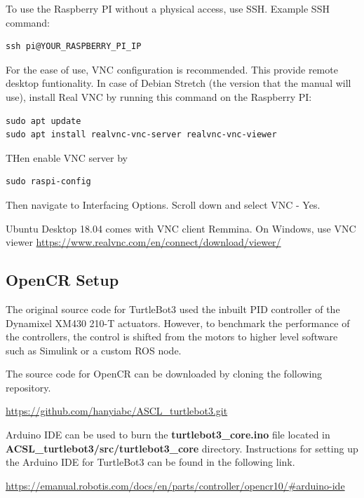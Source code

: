 \documentclass[12]{article}
\begin{document}
To use the Raspberry PI without a physical access, use SSH. Example SSH command:

\begin{lstlisting}[style=bash]
ssh pi@YOUR_RASPBERRY_PI_IP
\end{lstlisting}

For the ease of use, VNC configuration is recommended. This provide remote desktop funtionality. In case of Debian Stretch (the version that the manual will use), install Real VNC by running this command on the Raspberry PI:
\begin{lstlisting}[style=bash]
sudo apt update
sudo apt install realvnc-vnc-server realvnc-vnc-viewer
\end{lstlisting}
THen enable VNC server by 
\begin{lstlisting}[style=bash]
sudo raspi-config
\end{lstlisting}
Then navigate to Interfacing Options.
Scroll down and select VNC - Yes.


Ubuntu Desktop 18.04 comes with VNC client Remmina.
On Windows, use VNC viewer
\url{https://www.realvnc.com/en/connect/download/viewer/}
\subsection{OpenCR Setup}

The original source code for TurtleBot3 used the inbuilt PID controller of the Dynamixel XM430 210-T actuators. However, to benchmark the performance of the controllers, the control is shifted from the motors to higher level software such as Simulink or a custom ROS node.

The source code for OpenCR can be downloaded by cloning the following repository.

\url {https://github.com/hanyiabc/ASCL_turtlebot3.git}

Arduino IDE can be used to burn the \textbf{turtlebot3\_core.ino} file located in \textbf{ACSL\_turtlebot3/src/turtlebot3\_core} directory. Instructions for setting up the Arduino IDE for TurtleBot3 can be found in the following link.

\url {https://emanual.robotis.com/docs/en/parts/controller/opencr10/#arduino-ide}

\newpage
\end{document}
